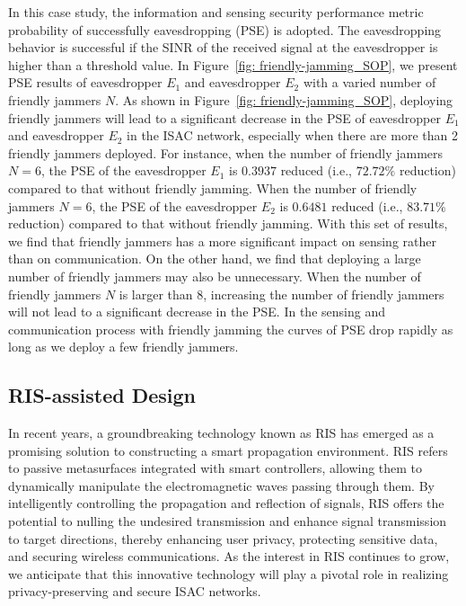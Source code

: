 \documentclass[10pt,journal,twocolumn,twoside]{IEEEtran} %
\begin{document}
In this case study, the information and sensing security performance metric probability of successfully eavesdropping (PSE) is adopted. The eavesdropping behavior is successful if the SINR of the received signal at the eavesdropper is higher than a threshold value. In Figure~\ref{fig: friendly-jamming_SOP}, we present PSE results of eavesdropper ${E_1}$ and eavesdropper ${E_2}$ with a varied number of friendly jammers $N$. As shown in Figure~\ref{fig: friendly-jamming_SOP}, deploying friendly jammers will lead to a significant decrease in the PSE of eavesdropper ${E_1}$ and eavesdropper ${E_2}$ in the ISAC network, especially when there are more than 2 friendly jammers deployed. 
For instance, when the number of friendly jammers $N=6$, the PSE of the eavesdropper ${E_1}$ is $0.3937$ reduced (i.e., $72.72\%$ reduction) compared to that without friendly jamming. When the number of friendly jammers $N=6$, the PSE of the eavesdropper ${E_2}$ is $0.6481$ reduced (i.e., $83.71\%$ reduction) compared to that without friendly jamming. With this set of results, we find that friendly jammers has a more significant impact on sensing rather than on communication.
On the other hand, we find that deploying a large number of friendly jammers may also be unnecessary. When the number of friendly jammers $N$ is larger than 8, increasing the number of friendly jammers will not lead to a significant decrease in the PSE. In the sensing and communication process with friendly jamming the curves of PSE drop rapidly as long as we deploy a few friendly jammers.


\subsection{RIS-assisted Design}
In recent years, a groundbreaking technology known as RIS has emerged as a promising solution to constructing a smart propagation environment. RIS refers to passive metasurfaces integrated with smart controllers, allowing them to dynamically manipulate the electromagnetic waves passing through them. By intelligently controlling the propagation and reflection of signals, RIS offers the potential to nulling the undesired transmission and enhance signal transmission to target directions, thereby enhancing user privacy, protecting sensitive data, and securing wireless communications. As the interest in RIS continues to grow, we anticipate that this innovative technology will play a pivotal role in realizing privacy-preserving and secure ISAC networks. 
\end{document}
